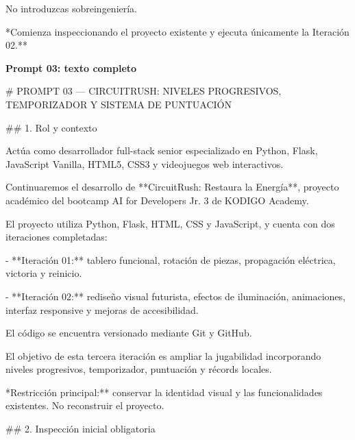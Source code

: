 \noindent No introduzcas sobreingeniería.\par
\par\smallskip
\noindent **Comienza inspeccionando el proyecto existente y ejecuta únicamente la Iteración 02.**\par
\clearpage
{}
\label{prompt:03}
{\sffamily\large\bfseries Prompt 03: texto completo\par}
\medskip
\noindent \# PROMPT 03 — CIRCUITRUSH: NIVELES PROGRESIVOS, TEMPORIZADOR Y SISTEMA DE PUNTUACIÓN\par
\par\smallskip
\noindent \#\# 1. Rol y contexto\par
\par\smallskip
\noindent Actúa como desarrollador full-stack senior especializado en Python, Flask, JavaScript Vanilla, HTML5, CSS3 y videojuegos web interactivos.\par
\par\smallskip
\noindent Continuaremos el desarrollo de **CircuitRush: Restaura la Energía**, proyecto académico del bootcamp AI for Developers Jr. 3 de KODIGO Academy.\par
\par\smallskip
\noindent El proyecto utiliza Python, Flask, HTML, CSS y JavaScript, y cuenta con dos iteraciones completadas:\par
\par\smallskip
\noindent - **Iteración 01:** tablero funcional, rotación de piezas, propagación eléctrica, victoria y reinicio.\par
\noindent - **Iteración 02:** rediseño visual futurista, efectos de iluminación, animaciones, interfaz responsive y mejoras de accesibilidad.\par
\par\smallskip
\noindent El código se encuentra versionado mediante Git y GitHub.\par
\par\smallskip
\noindent El objetivo de esta tercera iteración es ampliar la jugabilidad incorporando niveles progresivos, temporizador, puntuación y récords locales.\par
\par\smallskip
\noindent **Restricción principal:** conservar la identidad visual y las funcionalidades existentes. No reconstruir el proyecto.\par
\par\smallskip
\noindent \#\# 2. Inspección inicial obligatoria\par
